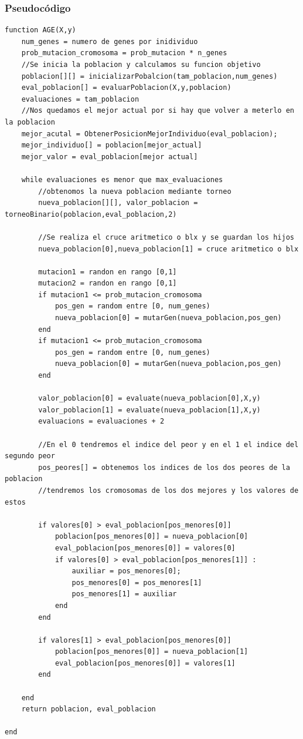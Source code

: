 \documentclass[titlepage]{article}
\begin{document}
	\subsubsection{Pseudocódigo}
		\begin{lstlisting}
function AGE(X,y)
	num_genes = numero de genes por inidividuo
	prob_mutacion_cromosoma = prob_mutacion * n_genes
	//Se inicia la poblacion y calculamos su funcion objetivo
	poblacion[][] = inicializarPobalcion(tam_poblacion,num_genes)
	eval_poblacion[] = evaluarPoblacion(X,y,poblacion)	
	evaluaciones = tam_poblacion
	//Nos quedamos el mejor actual por si hay que volver a meterlo en la poblacion
	mejor_acutal = ObtenerPosicionMejorIndividuo(eval_poblacion);
	mejor_individuo[] = poblacion[mejor_actual]
	mejor_valor = eval_poblacion[mejor actual]
	
	while evaluaciones es menor que max_evaluaciones		
		//obtenomos la nueva poblacion mediante torneo
		nueva_poblacion[][], valor_poblacion = torneoBinario(poblacion,eval_poblacion,2)
		
		//Se realiza el cruce aritmetico o blx y se guardan los hijos
		nueva_poblacion[0],nueva_poblacion[1] = cruce aritmetico o blx
			
		mutacion1 = randon en rango [0,1]
		mutacion2 = randon en rango [0,1]	
		if mutacion1 <= prob_mutacion_cromosoma
			pos_gen = random entre [0, num_genes)
			nueva_poblacion[0] = mutarGen(nueva_poblacion,pos_gen)
		end	
		if mutacion1 <= prob_mutacion_cromosoma
			pos_gen = random entre [0, num_genes)
			nueva_poblacion[0] = mutarGen(nueva_poblacion,pos_gen)
		end
		
		valor_poblacion[0] = evaluate(nueva_poblacion[0],X,y)
		valor_poblacion[1] = evaluate(nueva_poblacion[1],X,y)
		evaluacions = evaluaciones + 2
		
		//En el 0 tendremos el indice del peor y en el 1 el indice del segundo peor		
		pos_peores[] = obtenemos los indices de los dos peores de la poblacion
		//tendremos los cromosomas de los dos mejores y los valores de estos
		
		if valores[0] > eval_poblacion[pos_menores[0]]
			poblacion[pos_menores[0]] = nueva_poblacion[0]
			eval_poblacion[pos_menores[0]] = valores[0]
			if valores[0] > eval_poblacion[pos_menores[1]] :
				auxiliar = pos_menores[0];
				pos_menores[0] = pos_menores[1]
				pos_menores[1] = auxiliar
			end
		end
		
		if valores[1] > eval_poblacion[pos_menores[0]]
			poblacion[pos_menores[0]] = nueva_poblacion[1]
			eval_poblacion[pos_menores[0]] = valores[1]
		end
	
	end
	return poblacion, eval_poblacion
	
end
	\end{lstlisting}
\end{document}
